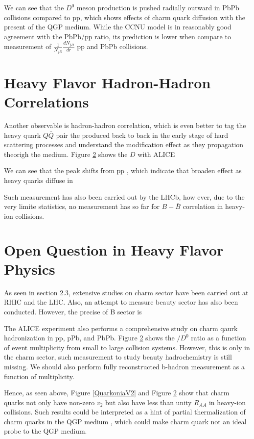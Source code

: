 We can see that the $D^0$ meson production is pushed radially outward in PbPb collisions compared to pp, which shows effects of charm quark diffusion with the present of the QGP medium. While the CCNU model is in reasonably good agreement with the PbPb/pp ratio, its prediction is lower when compare to measurement of $\frac{1}{N_{jD}}\frac{dN_{jD}}{dr}$ pp and PbPb collisions.

\section{Heavy Flavor Hadron-Hadron Correlations}

Another observable is hadron-hadron correlation, which is even better to tag the heavy quark $Q\bar Q$ pair the produced back to back in the early stage of hard scattering processes and understand the modification effect as they propagation theorigh the medium. Figure \ref{} shows the $D$ with ALICE

We can see that the peak shifts from pp , which indicate that broaden effect as heavy quarks diffuse in

Such measurement has also been carried out by the LHCb, how ever, due to the very limite statistics, no measurement has so far for $B-\bar B$ correlation in heavy-ion collisions.

\section{Open Question in Heavy Flavor Physics}

As seen in section 2.3, extensive studies on charm sector have been carried out at RHIC and the LHC. Also, an attempt to measure beauty sector has also been conducted. However, the precise of B sector is  


The ALICE experiment also performs a comprehensive study on charm qaurk hadronization in pp, pPb, and PbPb. Figure \ref{} shows the $/D^0$ ratio as a function of event multiplicity from small to large collision systems. However, this is only in the charm sector, such measurement to study beauty hadrochemistry is still missing. We should also perform fully reconstructed b-hadron measurement as a function of multiplicity. 

Hence, as seen above, Figure \ref{QuarkoniaV2} and Figure \ref{} show that charm quarks not only have non-zero $v_2$ but also have less than unity $R_{AA}$ in heavy-ion collisions. Such results could be interpreted as a hint of partial thermalization of charm quarks in the QGP medium \cite{CharmThermal}, which could make charm quark not an ideal probe to the QGP medium. 

